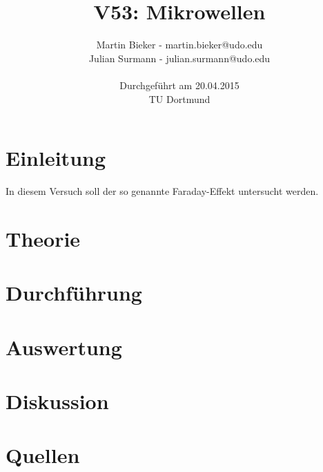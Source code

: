 \documentclass[a4paper]{article}
\title{\textbf{V53: Mikrowellen}}
\author{Martin Bieker - martin.bieker@udo.edu\\
Julian Surmann - julian.surmann@udo.edu\\
\\
Durchgef\"{u}hrt am 20.04.2015\\
TU Dortmund}
\date{}
\begin{document}
\renewcommand\tablename{Tabelle}
\renewcommand\figurename{Abbildung}
\maketitle
\thispagestyle{empty}
\newpage
\clearpage
\setcounter{page}{1}
\section{Einleitung}
In diesem Versuch soll der so genannte Faraday-Effekt untersucht werden. 
\section{Theorie}
\section{Durchführung}
\section{Auswertung}
\section{Diskussion}
\section{Quellen}
\end{document}
